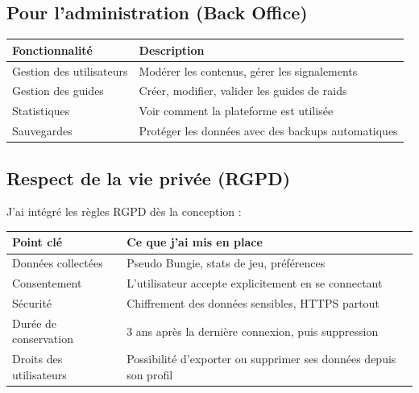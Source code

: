 \subsection*{Pour l'administration (Back Office)}

\begin{center}
    \begin{tabular}{|p{3.5cm}|p{6cm}|}
        \hline
        \textbf{Fonctionnalité} & \textbf{Description} \\
        \hline
    Gestion des utilisateurs & Modérer les contenus, gérer les signalements \\
        \hline
        Gestion des guides & Créer, modifier, valider les guides de raids \\
        \hline
        Statistiques & Voir comment la plateforme est utilisée \\
        \hline
        Sauvegardes & Protéger les données avec des backups automatiques \\
        \hline
    \end{tabular}
\end{center}

\subsection*{Respect de la vie privée (RGPD)}

J'ai intégré les règles RGPD dès la conception :

\begin{center}
    \begin{tabular}{|p{3cm}|p{7cm}|}
        \hline
        \textbf{Point clé} & \textbf{Ce que j'ai mis en place} \\
        \hline
        Données collectées & Pseudo Bungie, stats de jeu, préférences \\
        \hline
    Consentement & L'utilisateur accepte explicitement en se connectant \\
        \hline
        Sécurité & Chiffrement des données sensibles, HTTPS partout \\
        \hline
        Durée de conservation & 3 ans après la dernière connexion, puis suppression \\
        \hline
        Droits des utilisateurs & Possibilité d'exporter ou supprimer ses données depuis son profil \\
        \hline
    \end{tabular}
\end{center}

